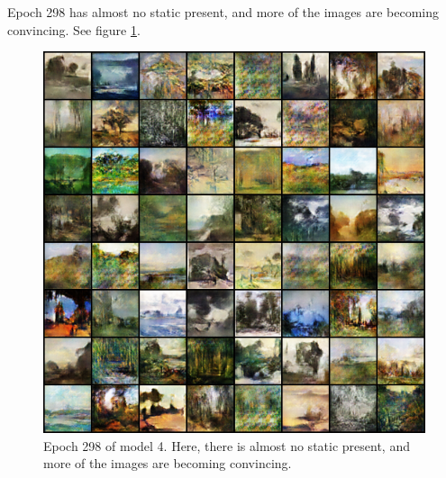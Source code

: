 \documentclass[11pt,letterpaper]{article}
\begin{document}
				Epoch 298 has almost no static present, and more of the images are becoming convincing.
				See figure \ref{fig:wa64:epoch298generator}.
				\begin{figure}
					\centering
					\includegraphics[width=1.0\linewidth]{results/model4/epoch298_generator}
					\caption{Epoch 298 of model 4. Here, there is almost no static present, and more of the images are becoming convincing.}
					\label{fig:wa64:epoch298generator}
				\end{figure}
\end{document}
